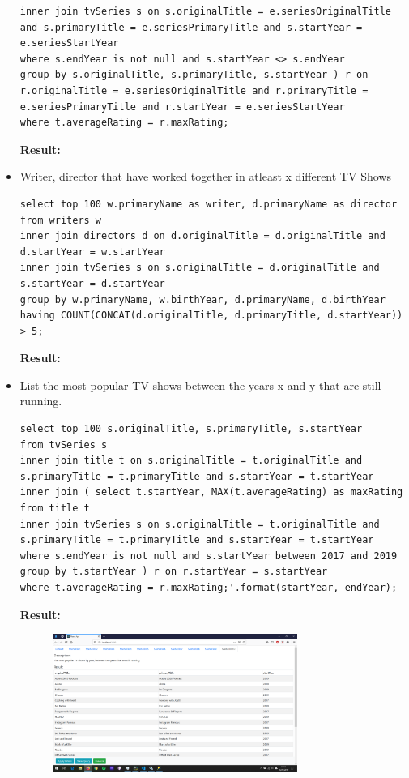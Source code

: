 \documentclass{sig-alternate}
\begin{document}
\begin{itemize}
\begin{lstlisting}
inner join tvSeries s on s.originalTitle = e.seriesOriginalTitle and s.primaryTitle = e.seriesPrimaryTitle and s.startYear = e.seriesStartYear
where s.endYear is not null and s.startYear <> s.endYear
group by s.originalTitle, s.primaryTitle, s.startYear ) r on r.originalTitle = e.seriesOriginalTitle and r.primaryTitle = e.seriesPrimaryTitle and r.startYear = e.seriesStartYear
where t.averageRating = r.maxRating;
                \end{lstlisting}
                \textbf{Result:}
		\item Writer, director that have worked together in atleast x different TV Shows
                \begin{lstlisting}
select top 100 w.primaryName as writer, d.primaryName as director
from writers w
inner join directors d on d.originalTitle = d.originalTitle and d.startYear = w.startYear
inner join tvSeries s on s.originalTitle = d.originalTitle and s.startYear = d.startYear
group by w.primaryName, w.birthYear, d.primaryName, d.birthYear
having COUNT(CONCAT(d.originalTitle, d.primaryTitle, d.startYear)) > 5;
                \end{lstlisting}
                \textbf{Result:}
		\item List the most popular TV shows between the years x and y that are still running.
                \begin{lstlisting}
select top 100 s.originalTitle, s.primaryTitle, s.startYear
from tvSeries s
inner join title t on s.originalTitle = t.originalTitle and s.primaryTitle = t.primaryTitle and s.startYear = t.startYear
inner join ( select t.startYear, MAX(t.averageRating) as maxRating
from title t
inner join tvSeries s on s.originalTitle = t.originalTitle and s.primaryTitle = t.primaryTitle and s.startYear = t.startYear
where s.endYear is not null and s.startYear between 2017 and 2019
group by t.startYear ) r on r.startYear = s.startYear
where t.averageRating = r.maxRating;'.format(startYear, endYear);
                \end{lstlisting}
                \textbf{Result:}
         	\begin{figure}[ht]
		    \includegraphics[width=8cm]{Screenshots/Scenario10.png}
		    \label{frontend}
		    \centering
	        \end{figure}
	\end{itemize}
	
	
\end{document}
